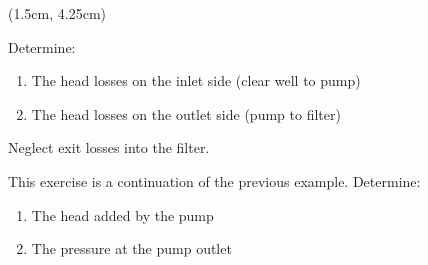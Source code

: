 \documentclass[9pt,xcolor={svgnames, x11names},mathpazo, professionalfonts]{beamer}
\begin{document}
\begin{frame}
	\begin{textblock*}{0.95\columnwidth}(1.5cm, 4.25cm)
		\begin{mybox}[title=Cont'd\ldots]{}{}
			Determine:
			\begin{enumerate}
				\item The head losses on the inlet side (clear well to pump)
				\item The head losses on the outlet side (pump to filter)
				      \suspend
			\end{enumerate}
			\par\medskip
			Neglect exit losses into the filter.
		\end{mybox}
	\end{textblock*}
	
\end{frame}

\begin{frame}{}
	\parm
	\begin{myexer}{}{}
		\raggedright
		This exercise is a continuation of the previous example. Determine:
		\begin{enumerate}
			\resume
			\item The head added by the pump
			\item The pressure at the pump outlet
		\end{enumerate}
	\end{myexer}
\end{frame}

\end{document}
